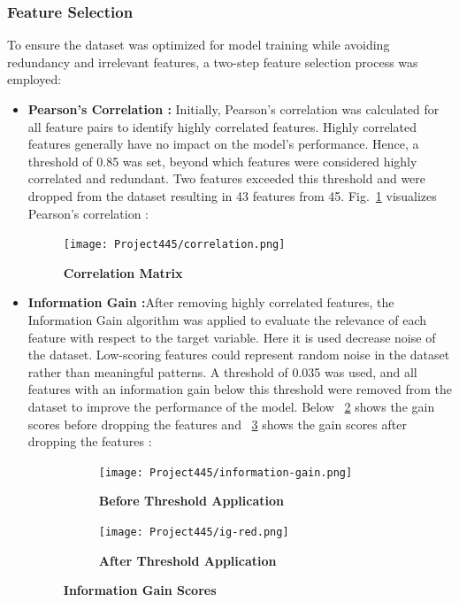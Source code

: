 \documentclass[pt]{article}  %
\begin{document}
\subsubsection{Feature Selection }To ensure the dataset was optimized for model training while avoiding redundancy and irrelevant features, a two-step feature selection process was employed:
\begin{itemize}
    \item \textbf{Pearson's Correlation :} Initially, Pearson’s correlation was calculated for all feature pairs to identify highly correlated features. Highly correlated features generally have no impact on the model's performance. Hence, a threshold of 0.85 was set, beyond which features were considered highly correlated and redundant. Two features exceeded this threshold and were dropped from the dataset resulting in 43 features from 45. Fig.~\ref{fig:figure3} visualizes Pearson's correlation :

\begin{figure}[H]
    \centering
    \texttt{[image: Project445/correlation.png]} %
    \caption{\textbf{Correlation Matrix}}
    \label{fig:figure3}
\end{figure}


    \item \textbf{Information Gain :}After removing highly correlated features, the Information Gain algorithm was applied to evaluate the relevance of each feature with respect to the target variable. Here it is used decrease noise of the dataset. Low-scoring features could represent random noise in the dataset rather than meaningful patterns.  A threshold of 0.035 was used, and all features with an information gain below this threshold were removed from the dataset to improve the performance of the model. Below ~\ref{fig:subfig1} shows  the gain scores before dropping the features and ~\ref{fig:subfig2} shows the gain scores after dropping the features : \vspace{0.5cm}

\begin{figure}[h]
    \centering
    \begin{subfigure}[b]{0.45\textwidth} %
        \centering
        \texttt{[image: Project445/information-gain.png]}
        \caption{\textbf{Before Threshold Application}}
        \label{fig:subfig1}
    \end{subfigure}
    \hfill %
    \begin{subfigure}[b]{0.45\textwidth} %
        \centering
        \texttt{[image: Project445/ig-red.png]} %
        \caption{\textbf{After Threshold Application}}
        \label{fig:subfig2}
    \end{subfigure}
    \caption{\textbf{Information Gain Scores}}
    \label{fig:figure}
\end{figure}
    
\end{itemize} 
\end{document}
